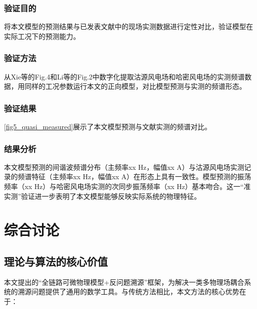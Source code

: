 \documentclass[withoutpreface,bwprint]{cumcmthesis}
\begin{document}
\subsubsection{验证目的}

将本文模型的预测结果与已发表文献中的现场实测数据进行定性对比，验证模型在实际工况下的预测能力。

\subsubsection{验证方法}

从Xie等\cite{xie2017characteristic}的Fig.4和Li等\cite{li2017complex}的Fig.2中数字化提取沽源风电场和哈密风电场的实测频谱数据，用同样的工况参数运行本文的正向模型，对比模型预测与实测的频谱形态。

\subsubsection{验证结果}

\cref{fig5_quasi_measured}展示了本文模型预测与文献实测的频谱对比。


\subsubsection{结果分析}

本文模型预测的间谐波频谱分布（主频率xx Hz，幅值xx A）与沽源风电场实测记录的频谱特征（主频率xx Hz，幅值xx A）在形态上具有一致性。模型预测的振荡频率（xx Hz）与哈密风电场实测的次同步振荡频率（xx Hz）基本吻合。这一“准实测”验证进一步表明了本文模型能够反映实际系统的物理特征。

\section{综合讨论}

\subsection{理论与算法的核心价值}

本文提出的“全链路可微物理模型+反问题溯源”框架，为解决一类多物理场耦合系统的溯源问题提供了通用的数学工具。与传统方法相比，本文方法的核心优势在于：
\end{document}
